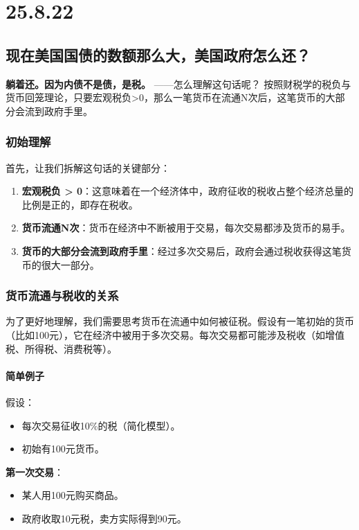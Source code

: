 \chapter{25.8.22}
\section{现在美国国债的数额那么大，美国政府怎么还？}
\textbf{躺着还。因为内债不是债，是税。}
——怎么理解这句话呢？
按照财税学的税负与货币回笼理论，只要宏观税负>0，那么一笔货币在流通N次后，这笔货币的大部分会流到政府手里。

\subsection{初始理解}
首先，让我们拆解这句话的关键部分：

\begin{enumerate}[leftmargin=*, nosep]
    \item \textbf{宏观税负 > 0}：这意味着在一个经济体中，政府征收的税收占整个经济总量的比例是正的，即存在税收。
    \item \textbf{货币流通N次}：货币在经济中不断被用于交易，每次交易都涉及货币的易手。
    \item \textbf{货币的大部分会流到政府手里}：经过多次交易后，政府会通过税收获得这笔货币的很大一部分。
\end{enumerate}

\subsection{货币流通与税收的关系}

为了更好地理解，我们需要思考货币在流通中如何被征税。假设有一笔初始的货币（比如100元），它在经济中被用于多次交易。每次交易都可能涉及税收（如增值税、所得税、消费税等）。

\subsubsection{简单例子}

假设：
\begin{itemize}
    \item 每次交易征收10\%的税（简化模型）。
    \item 初始有100元货币。
\end{itemize}

\textbf{第一次交易}：
\begin{itemize}[nosep]
    \item 某人用100元购买商品。
    \item 政府收取10元税，卖方实际得到90元。
\end{itemize}

